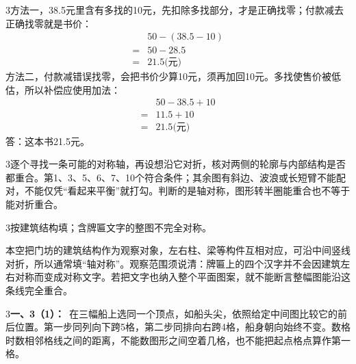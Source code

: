\documentclass[multi=snippet,border={5bp 20bp 5bp 5bp}]{standalone}
\newenvironment{snippet}[3]{\begin{minipage}{#1bp}\color{answerred}\fontsize{#2}{#3}\selectfont\raggedright}{\end{minipage}}
\begin{document}
\begin{snippet}{505}{11.5}{14}\begin{multicols}{3}\raggedcolumns 方法一，38.5元里含有多找的10元，先扣除多找部分，才是正确找零；付款减去正确找零就是书价：\[\begin{aligned}&50-(38.5-10)\\={}&50-28.5\\={}&21.5\text{(元)}\end{aligned}\]方法二，付款减错误找零，会把书价少算10元，须再加回10元。多找使售价被低估，所以补偿应使用加法：\[\begin{aligned}&50-38.5+10\\={}&11.5+10\\={}&21.5\text{(元)}\end{aligned}\]答：这本书21.5元。\end{multicols}\end{snippet}
\begin{snippet}{505}{11.5}{14}\begin{multicols}{3}\raggedcolumns 逐个寻找一条可能的对称轴，再设想沿它对折，核对两侧的轮廓与内部结构是否都重合。第1、3、5、6、7、10个符合条件；其余图有斜边、波浪或长短臂不能配对，不能仅凭“看起来平衡”就打勾。判断的是轴对称，图形转半圈能重合也不等于能对折重合。\end{multicols}\end{snippet}
\begin{snippet}{505}{11.5}{14}\begin{multicols}{3}\raggedcolumns 按建筑结构填；含牌匾文字的整图不完全对称。\par 本空把门坊的建筑结构作为观察对象，左右柱、梁等构件互相对应，可沿中间竖线对折，所以通常填“轴对称”。观察范围须说清：牌匾上的四个汉字并不会因建筑左右对称而变成对称文字。若把文字也纳入整个平面图案，就不能断言整幅图能沿这条线完全重合。\end{multicols}\end{snippet}
\begin{snippet}{505}{11.5}{14}\begin{multicols}{3}\raggedcolumns \textbf{一、3（1）：}\ 在三幅船上选同一个顶点，如船头尖，依照给定中间图比较它的前后位置。第一步同列向下跨5格，第二步同排向右跨4格，船身朝向始终不变。数格时数相邻格线之间的距离，不能数图形之间空着几格，也不能把起点格点算作第一格。\end{multicols}\end{snippet}
\end{document}
